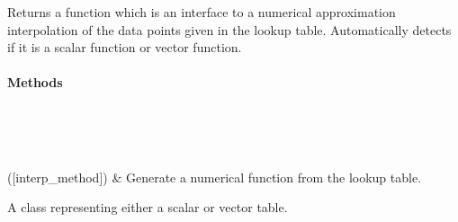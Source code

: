 \documentclass[letterpaper,10pt,english]{sphinxmanual}
\begin{document}
\begin{fulllineitems}
\begin{quote}
\begin{description}
\begin{itemize}
\end{itemize}

\end{description}\end{quote}


\begin{fulllineitems}
Returns a function which is an interface to a numerical approximation
interpolation of the data points given in the lookup table.
Automatically detects if it is a scalar function or vector function.

\end{fulllineitems}

\paragraph{Methods}


\begin{savenotes}\sphinxatlongtablestart\begin{longtable}{}
\hline

\endfirsthead

%
{}\\
\hline

\endhead

\hline
{}\\
\endfoot

\endlastfoot

{\hyperref[\detokenize{data_systematization:data_systematization.InterpolationTable.numerical_function}]{}}({[}interp\_method{]})
&
Generate a numerical function from the lookup table.
\\
\hline
\end{longtable}\sphinxatlongtableend\end{savenotes}

\begin{fulllineitems}
\label{\detokenize{data_systematization:data_systematization.InterpolationTable.__init__}}
A class representing either a scalar or vector table.


\end{fulllineitems}
\end{fulllineitems}
\end{document}
